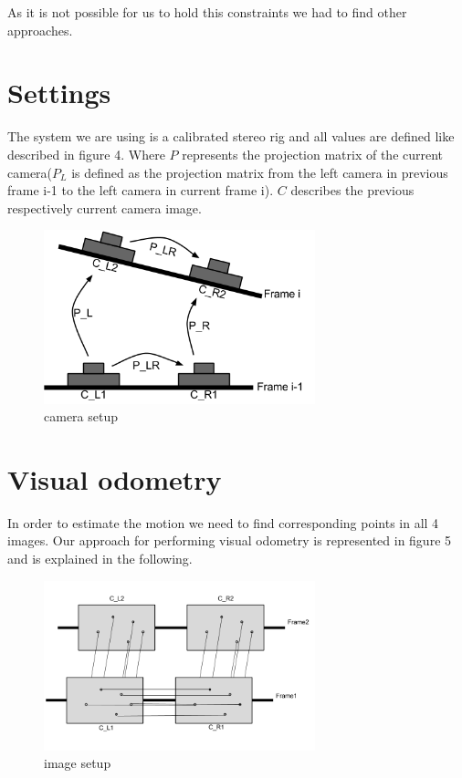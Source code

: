 \documentclass[11pt]{article}
\begin{document}
	As it is not possible for us to hold this constraints we had to find other approaches.

	\section{Settings}
	The system we are using is a calibrated stereo rig \cite{malik-hiller-2015} and all values are defined like described in figure 4. Where $P$ represents the projection matrix of the current camera($P_L$ is defined as the projection matrix from the left camera in previous frame i-1 to the left camera in current frame i). $C$ describes the previous respectively current camera image.
	
	\begin{figure}[H]
		\centering
		\includegraphics[width=0.7\textwidth]{images/camera_setup.png}
		\caption{camera setup}
	\end{figure}
	
	\newpage
	
	\section{Visual odometry}
	In order to estimate the motion we need to find corresponding points in all 4 images. Our approach for performing visual odometry is represented in figure 5 and is explained in the following.
	
	\begin{figure}[H]
		\centering
		\includegraphics[width=0.7\textwidth]{images/image_setup.png}
		\caption{image setup}
	\end{figure}
	
\end{document}

